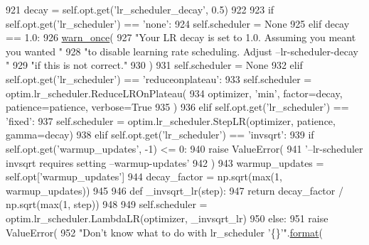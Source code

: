 \begin{DoxyCode}
921         decay = self.opt.get(\textcolor{stringliteral}{'lr\_scheduler\_decay'}, 0.5)
922 
923         \textcolor{keywordflow}{if} self.opt.get(\textcolor{stringliteral}{'lr\_scheduler'}) == \textcolor{stringliteral}{'none'}:
924             self.scheduler = \textcolor{keywordtype}{None}
925         \textcolor{keywordflow}{elif} decay == 1.0:
926             \hyperlink{namespaceparlai_1_1utils_1_1misc_a884a3aefa90581f53bc592fa6a78dc43}{warn\_once}(
927                 \textcolor{stringliteral}{"Your LR decay is set to 1.0. Assuming you meant you wanted "}
928                 \textcolor{stringliteral}{"to disable learning rate scheduling. Adjust --lr-scheduler-decay "}
929                 \textcolor{stringliteral}{"if this is not correct."}
930             )
931             self.scheduler = \textcolor{keywordtype}{None}
932         \textcolor{keywordflow}{elif} self.opt.get(\textcolor{stringliteral}{'lr\_scheduler'}) == \textcolor{stringliteral}{'reduceonplateau'}:
933             self.scheduler = optim.lr\_scheduler.ReduceLROnPlateau(
934                 optimizer, \textcolor{stringliteral}{'min'}, factor=decay, patience=patience, verbose=\textcolor{keyword}{True}
935             )
936         \textcolor{keywordflow}{elif} self.opt.get(\textcolor{stringliteral}{'lr\_scheduler'}) == \textcolor{stringliteral}{'fixed'}:
937             self.scheduler = optim.lr\_scheduler.StepLR(optimizer, patience, gamma=decay)
938         \textcolor{keywordflow}{elif} self.opt.get(\textcolor{stringliteral}{'lr\_scheduler'}) == \textcolor{stringliteral}{'invsqrt'}:
939             \textcolor{keywordflow}{if} self.opt.get(\textcolor{stringliteral}{'warmup\_updates'}, -1) <= 0:
940                 \textcolor{keywordflow}{raise} ValueError(
941                     \textcolor{stringliteral}{'--lr-scheduler invsqrt requires setting --warmup-updates'}
942                 )
943             warmup\_updates = self.opt[\textcolor{stringliteral}{'warmup\_updates'}]
944             decay\_factor = np.sqrt(max(1, warmup\_updates))
945 
946             \textcolor{keyword}{def }\_invsqrt\_lr(step):
947                 \textcolor{keywordflow}{return} decay\_factor / np.sqrt(max(1, step))
948 
949             self.scheduler = optim.lr\_scheduler.LambdaLR(optimizer, \_invsqrt\_lr)
950         \textcolor{keywordflow}{else}:
951             \textcolor{keywordflow}{raise} ValueError(
952                 \textcolor{stringliteral}{"Don't know what to do with lr\_scheduler '\{\}'"}.\hyperlink{namespaceparlai_1_1chat__service_1_1services_1_1messenger_1_1shared__utils_a32e2e2022b824fbaf80c747160b52a76}{format}(

\end{DoxyCode}
